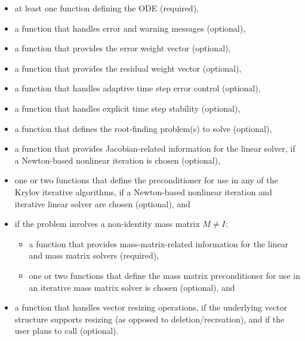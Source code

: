 \documentclass[letterpaper,10pt,english]{sphinxmanual}
\begin{document}
\begin{itemize}
\item {} 
at least one function defining the ODE (required),

\item {} 
a function that handles error and warning messages (optional),

\item {} 
a function that provides the error weight vector (optional),

\item {} 
a function that provides the residual weight vector (optional),

\item {} 
a function that handles adaptive time step error control (optional),

\item {} 
a function that handles explicit time step stability (optional),

\item {} 
a function that defines the root-finding problem(s) to solve
(optional),

\item {} 
a function that provides Jacobian-related information for the linear
solver, if a Newton-based nonlinear iteration is chosen (optional),

\item {} 
one or two functions that define the preconditioner for use in any
of the Krylov iterative algorithms, if a Newton-based nonlinear
iteration and iterative linear solver are chosen (optional), and

\item {} 
if the problem involves a non-identity mass matrix \(M\ne I\):
\begin{itemize}
\item {} 
a function that provides mass-matrix-related information for the
linear and mass matrix solvers (required),

\item {} 
one or two functions that define the mass matrix preconditioner
for use in an iterative mass matrix solver is chosen (optional), and

\end{itemize}

\item {} 
a function that handles vector resizing operations, if the
underlying vector structure supports resizing (as opposed to
deletion/recreation), and if the user plans to call
{\hyperref[c_interface/User_callable:c.ARKodeResize]{\emph{}}} (optional).

\end{itemize}
\end{document}
